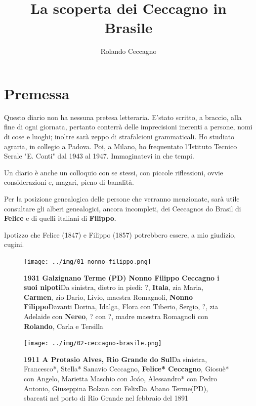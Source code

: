 \documentclass[a4paper,10pt]{book}
\title{La scoperta dei Ceccagno in Brasile}
\author{Rolando Ceccagno}
\begin{document}
\maketitle
\tableofcontents

\chapter*{Premessa}

Questo diario non ha nessuna pretesa letteraria. E’stato scritto, a braccio, alla fine di ogni giornata, pertanto conterrà delle imprecisioni inerenti a persone, nomi di cose e luoghi; inoltre sarà zeppo di strafalcioni grammaticali. Ho studiato agraria, in collegio a Padova. Poi, a Milano, ho frequentato l’Istituto Tecnico Serale "E. Conti" dal 1943 al 1947. Immaginatevi in che tempi.

Un diario è anche un colloquio con se stessi, con piccole riflessioni, ovvie considerazioni e, magari, pieno di banalità.

Per la posizione genealogica delle persone che verranno menzionate, sarà utile consultare gli alberi genealogici, ancora incompleti, dei Ceccagnos do Brasil di \textbf{Felice} e di quelli italiani di \textbf{Filippo}.

Ipotizzo che Felice (1847) e Filippo (1857) potrebbero essere, a mio giudizio, cugini.

\begin{figure}[htp]
\centering
\texttt{[image: ../img/01-nonno-filippo.png]}\label{fig:01-nonno-filippo}
\caption{\textbf{1931 Galzignano Terme (PD) Nonno Filippo Ceccagno i suoi nipoti}\newline Da sinistra, dietro in piedi: ?, \textbf{Itala}, zia Maria, \textbf{Carmen}, zio Dario, Livio, maestra Romagnoli, \textbf{Nonno Filippo}\newline Davanti Dorina, Idalga, Flora con Tiberio, Sergio, ?, zia Adelaide con \textbf{Nereo}, ? con ?, madre maestra Romagnoli con \textbf{Rolando}, Carla e Tersilla} 
\end{figure}

\begin{figure}[htp]
\centering
\texttt{[image: ../img/02-ceccagno-brasile.png]}\label{fig:02-ceccagno-brasile}
\caption{\textbf{1911 A Protasio Alves, Rio Grande do Sul}\newline Da sinistra, Francesco*, Stella* Sanavio Ceccagno, \textbf{Felice* Ceccagno}, Giosuè* con Angelo, Marietta Maschio con Joáo, Alessandro* con Pedro Antonio, Giuseppina Bolzan con Felix\newline * Da Abano Terme(PD), sbarcati nel porto di Rio Grande nel febbraio del 1891}
\end{figure}
\end{document}
